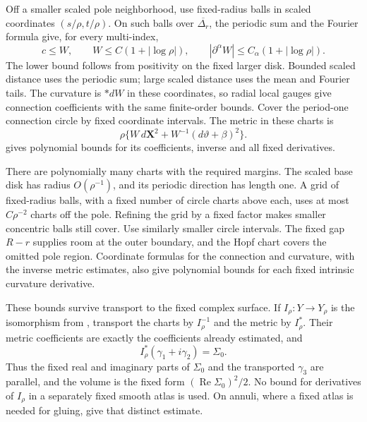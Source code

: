 Off a smaller scaled pole neighborhood, use fixed-radius balls
in scaled coordinates \((s/\rho,t/\rho)\).
On such balls over \(\overline{\Delta_r}\), the periodic sum and
the Fourier formula give, for every multi-index,
\begin{equation}\label{eq:nodal-scaled-regular-bounds}
 c\le W,\qquad W\le C(1+|\log\rho|),\qquad
 |\partial^\alpha W|\le C_\alpha(1+|\log\rho|).
\end{equation}
The lower bound follows from positivity on the fixed larger
disk.  Bounded scaled distance uses the periodic sum; large
scaled distance uses the mean and Fourier tails.
The curvature is \(*dW\) in these coordinates, so radial local
gauges give connection coefficients with the same finite-order
bounds.  Cover the period-one connection circle by fixed
coordinate intervals.  The metric in these charts is
\[
 \rho\{W\,d\mathbf X^2+
              W^{-1}(d\vartheta+\beta)^2\}.
\]
 gives polynomial bounds for
its coefficients, inverse and all fixed derivatives.

There are polynomially many charts with the required margins.
The scaled base disk has radius \(O(\rho^{-1})\), and its
periodic direction has length one.  A grid of fixed-radius balls,
with a fixed number of circle charts above each, uses at most
\(C\rho^{-2}\) charts off the pole.  Refining the grid by a
fixed factor makes smaller concentric balls still cover.
Use similarly smaller circle intervals.  The fixed gap \(R-r\)
supplies room at the outer boundary, and the Hopf chart covers
the omitted pole region.  Coordinate formulas for the connection
and curvature, with the inverse metric estimates, also give
polynomial bounds for each fixed intrinsic curvature derivative.

These bounds survive transport to the fixed complex surface.
If \(I_\rho:Y\to Y_\rho\) is the isomorphism from
, transport the charts by
\(I_\rho^{-1}\) and the metric by \(I_\rho^*\).
Their metric coefficients are exactly the coefficients already
estimated, and
\[
 I_\rho^*(\gamma_1+i\gamma_2)=\Sigma_0.
\]
Thus the fixed real and imaginary parts of \(\Sigma_0\) and the
transported \(\gamma_3\) are parallel, and the volume is the
fixed form \((\operatorname{Re}\Sigma_0)^2/2\).
No bound for derivatives of \(I_\rho\) in a separately fixed
smooth atlas is used.  On annuli, where a fixed atlas is needed
for gluing, 
give that distinct estimate.

